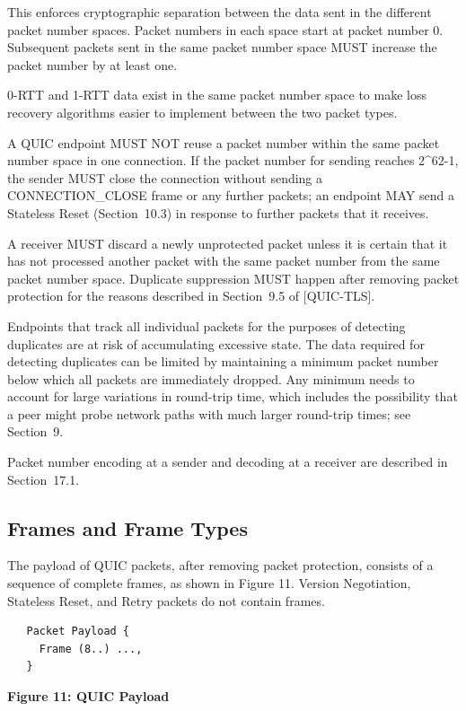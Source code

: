 \documentclass{article}
\begin{document}
This enforces cryptographic separation between the data sent in the different packet number spaces.  Packet numbers in each space start at packet number 0.  Subsequent packets sent in the same packet number space MUST increase the packet number by at least one.

0-RTT and 1-RTT data exist in the same packet number space to make loss recovery algorithms easier to implement between the two packet types.

A QUIC endpoint MUST NOT reuse a packet number within the same packet number space in one connection.  If the packet number for sending reaches 2\textasciicircum{}62-1, the sender MUST close the connection without sending a CONNECTION\_CLOSE frame or any further packets; an endpoint MAY send a Stateless Reset (Section~10.3) in response to further packets that it receives.

A receiver MUST discard a newly unprotected packet unless it is certain that it has not processed another packet with the same packet number from the same packet number space.  Duplicate suppression MUST happen after removing packet protection for the reasons described in Section~9.5 of [QUIC-TLS].

Endpoints that track all individual packets for the purposes of detecting duplicates are at risk of accumulating excessive state. The data required for detecting duplicates can be limited by maintaining a minimum packet number below which all packets are immediately dropped.  Any minimum needs to account for large variations in round-trip time, which includes the possibility that a peer might probe network paths with much larger round-trip times; see Section~9.

Packet number encoding at a sender and decoding at a receiver are described in Section~17.1.

\subsection{Frames and Frame Types}

The payload of QUIC packets, after removing packet protection, consists of a sequence of complete frames, as shown in Figure 11. Version Negotiation, Stateless Reset, and Retry packets do not contain frames.

\begin{verbatim}
   Packet Payload {
     Frame (8..) ...,
   }
\end{verbatim}

\begin{center}
\textbf{Figure 11: QUIC Payload}
\end{center}
\end{document}
